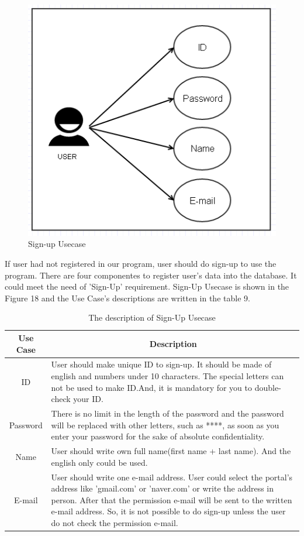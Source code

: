 \documentclass[conference]{IEEEtran}
\begin{document}
\begin{figure}[H]
\begin{center}
    \includegraphics[scale=0.7]{img_19.png}
    \caption{Sign-up Usecase} 
\end{center}
\end{figure}
 		  
 
If user had not registered in our program, user should do sign-up to use the program. There are four componentes to register user's data into the database. It could meet the need of 'Sign-Up' requirement. Sign-Up Usecase is shown in the Figure 18 and the Use Case's descriptions are written in the table 9.

\begin{table}[h]
{\renewcommand\arraystretch{1.25}
\caption{The description of Sign-Up Usecase}
\begin{tabular}{|c|l|l|} \hline
Use Case & \multicolumn{2}{c|}{Description} \\ \hline\hline
ID& \multicolumn{2}{p{6.75cm}|}{\raggedright User should make unique ID to sign-up. It should be made of english and numbers under 10 characters. The special letters can not be used to make ID.And, it is mandatory for you to double-check your ID.} \\ \hline
Password & \multicolumn{2}{p{6.75cm}|}{\raggedright There is  no limit in the length of the password and the password will be replaced with other letters, such as ****, as soon as you enter your password for the sake of absolute confidentiality.} \\ \hline
Name& \multicolumn{2}{p{6.75cm}|}{\raggedright User should write own full name(first name + last name). And the english only could be used.} \\ \hline
E-mail& \multicolumn{2}{p{6.75cm}|}{\raggedright User should write one e-mail address. User could select the portal's address like 'gmail.com' or 'naver.com' or write the address in person. After that the permission e-mail will be sent to the written e-mail address. So, it is not possible to do sign-up unless the user do not check the permission e-mail.} \\ \hline
\end{tabular}}
\end{table} 
\end{document}
